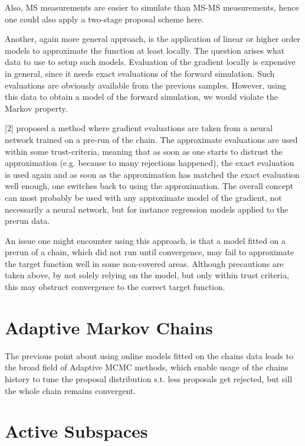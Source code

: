 \documentclass[10pt]{article}
\begin{document}
Also, MS measurements are easier to simulate than MS-MS measurements, hence one could also apply
a two-stage proposal scheme here.

Another, again more general approach, is the application of linear or higher order models to 
approximate the function at least locally.
The question arises what data to use to setup such models.
Evaluation of the gradient locally is expensive in general, since it needs exact evaluations of
the forward simulation.
Such evaluations are obviously available from the previous samples.
However, using this data to obtain a model of the forward simulation, we would violate the Markov
property.

[2] proposed a method where gradient evaluations are taken from a neural network trained on a pre-run of
the chain.
The approximate evaluations are used within some trust-criteria, meaning that as soon as one starts
to distrust the approximation (e.g. because to many rejections happened), the exact evaluation is used
again and as soon as the approximation has matched the exact evaluation well enough, one switches back
to using the approximation.
The overall concept can most probably be used with any approximate model of the gradient, not necessarily
a neural network, but for instance regression models applied to the prerun data.

An issue one might encounter using this approach, is that a model fitted on a prerun of a chain,
which did not run until convergence, may fail to approximate the target function well in some non-covered areas.
Although precautions are taken above, by not solely relying on the model, but only within trust criteria,
this may obstruct convergence to the correct target function.


\section{Adaptive Markov Chains}

The previous point about using online models fitted on the chains data leads to the broad field of Adaptive MCMC 
methods, which enable usage of the chains history to tune the proposal distribution s.t. less proposals get rejected,
but sill the whole chain remains convergent.



\section{Active Subspaces}
\end{document}
